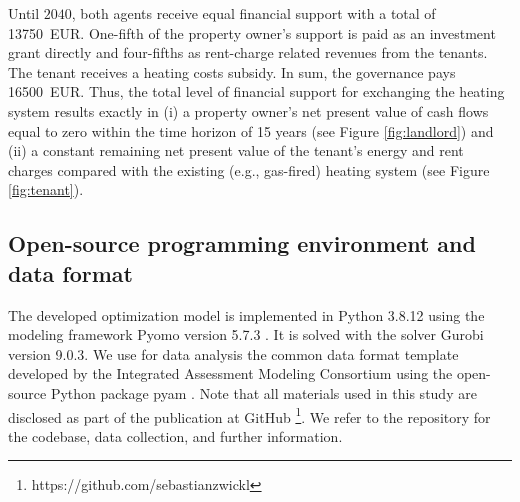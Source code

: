 Until $2040$, both agents receive equal financial support with a total of \SI{13750}{EUR}. One-fifth of the property owner's support is paid as an investment grant directly and four-fifths as rent-charge related revenues from the tenants. The tenant receives a heating costs subsidy. In sum, the governance pays \SI{16500}{EUR}. Thus, the total level of financial support for exchanging the heating system results exactly in (i) a property owner's net present value of cash flows equal to zero within the time horizon of 15 years (see Figure \ref{fig:landlord}) and (ii) a constant remaining net present value of the tenant's energy and rent charges compared with the existing (e.g., gas-fired) heating system (see Figure \ref{fig:tenant}). 

\subsection{Open-source programming environment and data format}\label{met:os}
The developed optimization model is implemented in Python 3.8.12 using the modeling framework Pyomo version 5.7.3 \cite{hart2017optimization}. It is solved with the solver Gurobi version 9.0.3. We use for data analysis the common data format template developed by the Integrated Assessment Modeling Consortium using the open-source Python package pyam \cite{huppmann2021pyam}. Note that all materials used in this study are disclosed as part of the publication at GitHub \footnote{https://github.com/sebastianzwickl}. We refer to the repository for the codebase, data collection, and further information. 